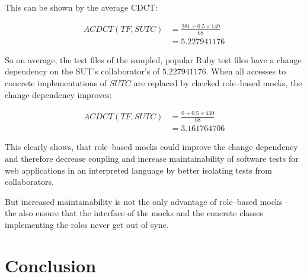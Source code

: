 This can be shown by the average \ac{CDCT}:

\begin{align*}
ACDCT(TF, SUTC) & = \frac{281 + 0.5 \times 149}{68} \\
& = 5.227941176
\end{align*}

So on average, the test files of the sampled, popular Ruby test files have a change dependency on the \ac{SUT}'s collaborator's of $5.227941176$.
When all accesses to concrete implementations of $SUTC$ are replaced by checked role–based mocks, the change dependency improves:

\begin{align*}
ACDCT(TF, SUTC) & = \frac{0 + 0.5 \times 430}{68} \\
& = 3.161764706
\end{align*}

This clearly shows, that role–based mocks could improve the change dependency and therefore decrease coupling and increase maintainability of software tests for web applications in an interpreted language by better isolating tests from collaborators.

But increased maintainability is not the only advantage of role–based mocks – the also ensure that the interface of the mocks and the concrete classes implementing the roles never get out of sync.

\section{Conclusion}